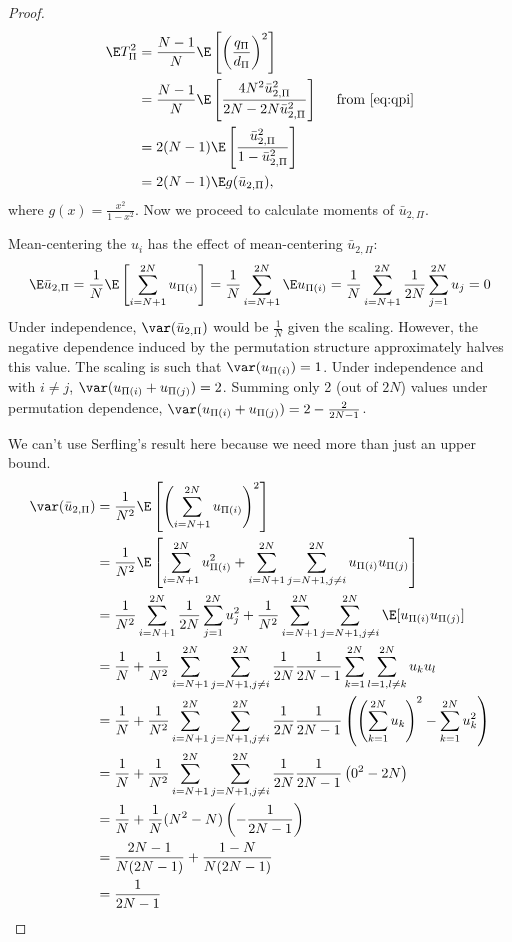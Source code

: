 \begin{proof}
  \begin{align}
    \E T_{\Pi}^2
    &= \frac{N-1}{N} \E \left [ \left ( \frac{q_\Pi}{d_\Pi} \right )^2 \right ] \\
    &= \frac{N-1}{N} \E \left [\frac{
        4 N^2\bar{u}_{2,\Pi}^2}{2N-2N\bar{u}_{2,\Pi}^2} \right ] \quad \text{ from } \eqref{eq:qpi}
    \nonumber \\
    &= 2(N-1)\E \left [\frac{
        \bar{u}_{2,\Pi}^2}{1-\bar{u}_{2,\Pi}^2} \right ] \nonumber \\
    &= 2(N-1) \E g(\bar{u}_{2,\Pi}), \label{def:varT}
  \end{align}
  where $g(x) = \frac{x^2}{1-x^2}$. Now we proceed to calculate moments of $\bar{u}_{2,\Pi}$.

  Mean-centering the $u_{i}$ has the effect of mean-centering $\bar{u}_{2,\Pi}$:
  \begin{equation*}
    \E \bar{u}_{2,\Pi} =
    \frac{1}{N} \E \left [ \sum_{i=N+1}^{2N} u_{\Pi(i)} \right ] =
    \frac{1}{N} \sum_{i=N+1}^{2N} \E u_{\Pi(i)} =
    \frac{1}{N} \sum_{i=N+1}^{2N} \frac{1}{2N} \sum_{j=1}^{2N} u_{j} = 0
  \end{equation*}
  Under independence, $\var(\bar{u}_{2,\Pi})$ would be $\frac{1}{N}$ given
  the scaling.  However, the negative dependence induced by the
  permutation structure approximately halves this value.
  The scaling is such that $\var(u_{\Pi(i)}) = 1$.  Under independence and
  with $i \neq j$, $\var(u_{\Pi(i)} + u_{\Pi(j)}) = 2$.  Summing only 2 (out of $2N$)
  values under permutation dependence, $\var(u_{\Pi(i)} + u_{\Pi(j)}) = 2 - \frac{2}{2N-1}$.

  We can't use Serfling's result here because we need more than just an upper bound.
  \begin{align*}
    \var(\bar{u}_{2,\Pi})
    &= \frac{1}{N^2} \E \left [\left (\sum_{i=N+1}^{2N}u_{\Pi(i)}\right )^2\right ] \\
    &= \frac{1}{N^2} \E \left [\sum_{i=N+1}^{2N} u_{\Pi(i)}^2 +
    \sum_{i=N+1}^{2N}\sum_{j=N+1, j\neq i}^{2N}u_{\Pi(i)}u_{\Pi(j)} \right ] \\
    &= \frac{1}{N^2} \sum_{i=N+1}^{2N} \frac{1}{2N} \sum_{j=1}^{2N} u_{j}^2
    + \frac{1}{N^2}\sum_{i=N+1}^{2N}\sum_{j=N+1, j\neq
      i}^{2N} \E[u_{\Pi(i)} u_{\Pi(j)}] \\
    &= \frac{1}{N} + \frac{1}{N^2}\sum_{i=N+1}^{2N}\sum_{j=N+1, j\neq
      i}^{2N} \frac{1}{2N}\frac{1}{2N-1}\sum_{k=1}^{2N}
    \sum_{l=1, l\neq k}^{2N} u_ku_l \\
    &= \frac{1}{N} + \frac{1}{N^2}\sum_{i=N+1}^{2N}\sum_{j=N+1, j\neq
      i}^{2N} \frac{1}{2N}\frac{1}{2N-1} \left (
    \left (\sum_{k=1}^{2N} u_k \right )^2 - \sum_{k=1}^{2N} u_k^2
  \right ) \\
    &= \frac{1}{N} + \frac{1}{N^2}\sum_{i=N+1}^{2N}\sum_{j=N+1, j\neq
      i}^{2N} \frac{1}{2N}\frac{1}{2N-1} \left (
    0^2 - 2N \right ) \\
    &= \frac{1}{N} + \frac{1}{N}(N^2-N)\left (-\frac{1}{2N-1}\right ) \\
    &= \frac{2N-1}{N(2N-1)} + \frac{1-N}{N(2N-1)} \\
    &= \frac{1}{2N-1}
  \end{align*}


\end{proof}
